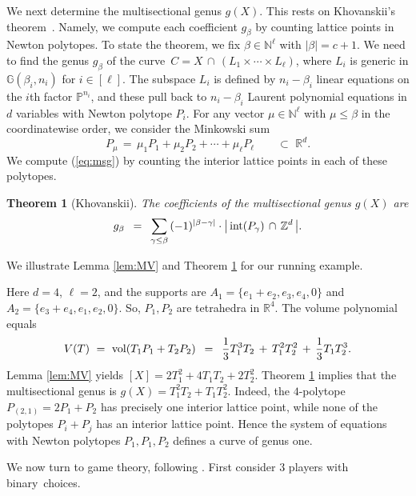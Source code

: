 \documentclass[12pt]{article}
\newtheorem{theorem}{Theorem}[section]
\theoremstyle{definition}
\newenvironment{example}
{\pushQED{\qed}\renewcommand{\qedsymbol}{$\diamond$}\examplex}
{\popQED\endexamplex}
\newcommand{\bR}{\mathbb R}
\newcommand{\bZ}{\mathbb Z}
\newcommand{\bN}{\mathbb N}
\newcommand{\bG}{\mathbb G}
\newcommand{\bP}{\mathbb P}
\begin{document}
We next determine
the multisectional genus $g(X)$. This rests on Khovanskii's theorem~\cite[Theorem 1]{Kho}. 
Namely, we compute each coefficient $g_\beta$
by counting lattice points in Newton polytopes.
To state the theorem, we fix $\beta \in \bN^\ell$ with $|\beta| = c+1$.
We need to find the genus $g_\beta$ of the curve
$\,C  = X \,\cap \, (L_1 \times \cdots \times L_\ell) $,
where $L_i $ is generic in $ \bG(\beta_i,n_i)$ for $i \in [\ell]$.
The subspace $L_i$ is defined by $n_i-\beta_i$ linear equations
on the $i$th factor $\bP^{n_i}$, and these pull back to $n_i-\beta_i$ 
Laurent polynomial equations in $d$ variables with Newton polytope $P_i$.
For any vector $\mu \in \bN^\ell$ with $\mu \leq \beta$
in the coordinatewise order, we consider the Minkowski sum
$$P_\mu \, = \,\mu_1 P_1 + \mu_2 P_2 + \cdots + \mu_\ell P_\ell
\qquad \subset \,\, \bR^d. $$
We compute (\ref{eq:msg}) by counting
the interior lattice points in each of these polytopes.

\begin{theorem}[Khovanskii] \label{thm:khovanskii} The
coefficients of the multisectional genus $g(X)$  are
$$ g_\beta \,\,\, = \,\,\,\sum_{\gamma \leq \beta} \,(-1)^{|\beta-\gamma|}  \cdot
 \bigl|\, {\rm int}(P_\gamma) \,\cap \,\bZ^d \,\bigr|. $$
\end{theorem}

We illustrate Lemma \ref{lem:MV} and Theorem \ref{thm:khovanskii} for our running example.

\begin{example}[Toric $4$-fold]
Here $d = 4$, $\ell = 2$, and the supports are $A_1 = \{e_1+e_2,e_3,e_4,0\}$ and $A_2 = \{e_3+e_4,e_1,e_2,0\}$.
So, $P_1,P_2$ are tetrahedra in $\bR^4$. The volume polynomial equals
$$ V(T) \,\,=\,\, {\rm vol}(T_1 P_1 + T_2 P_2) \,\,\,=\,\,\, \frac{1}{3} T_1^3 T_2 \,+\,  T_1^2 T_2^2 \,+\, \frac{1}{3} T_1 T_2^3. $$
Lemma \ref{lem:MV} yields $[X] = 2 T_1^2 + 4 T_1 T_2  + 2T_2^2$. 
Theorem \ref{thm:khovanskii} implies that
the multisectional genus is $g(X) = T_1^2 T_2 + T_1 T_2^2$.
Indeed, the $4$-polytope
$P_{(2,1)} = 2P_1 +P_2$ has  precisely one interior lattice point, while none
of the polytopes $P_i+P_j$ has an interior lattice point.
Hence the system of  equations with Newton polytopes $P_1,P_1,P_2$
defines a curve of genus one. 
\end{example}

We now turn to game theory, following \cite{vectorBundleNash}.
First consider $3$ players with binary~choices.
\end{document}
